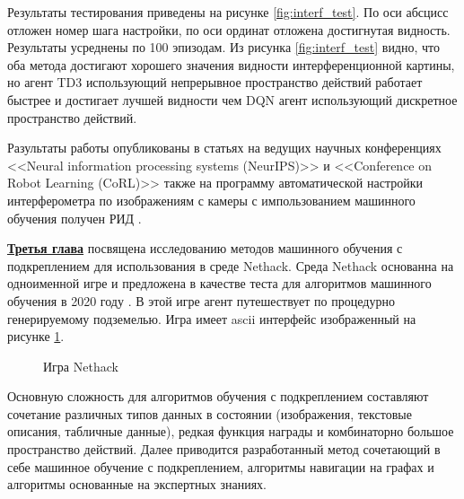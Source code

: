Результаты тестирования приведены на рисунке \ref{fig:interf_test}. По оси абсцисс отложен номер шага настройки, по оси ординат отложена достигнутая видность. Результаты усреднены по 100 эпизодам. Из рисунка \ref{fig:interf_test} видно, что оба метода достигают хорошего значения видности интерференционной картины, но агент TD3 использующий непрерывное пространство действий работает быстрее и достигает лучшей видности чем DQN агент использующий дискретное пространство действий. 


Разультаты работы опубликованы в статьях \cite{confbib1, confbib2} на ведущих научных конференциях <<Neural information processing systems (NeurIPS)>> и <<Conference on Robot Learning (CoRL)>> также на программу автоматической настройки интерферометра по изображениям с камеры с импользованием машинного обучения получен РИД \cite{progbib1}.

\underline{\textbf{Третья глава}} посвящена исследованию методов машинного обучения с подкреплением для использования в среде Nethack. Среда Nethack основанна на одноименной игре и предложена в качестве теста для алгоритмов машинного обучения в 2020 году \cite{nethack}. В этой игре агент путешествует по процедурно генерируемому подземелью. Игра имеет ascii интерфейс изображенный на рисунке \ref{fig:nethack}.

\begin{figure}[ht]
    \caption{Игра Nethack}\label{fig:nethack}
\end{figure}

Основную сложность для алгоритмов обучения с подкреплением составляют сочетание различных типов данных в состоянии (изображения, текстовые описания, табличные данные), редкая функция награды и комбинаторно большое пространство действий. Далее приводится разработанный метод сочетающий в себе машинное обучение с подкреплением, алгоритмы навигации на графах и алгоритмы основанные на экспертных знаниях. 

